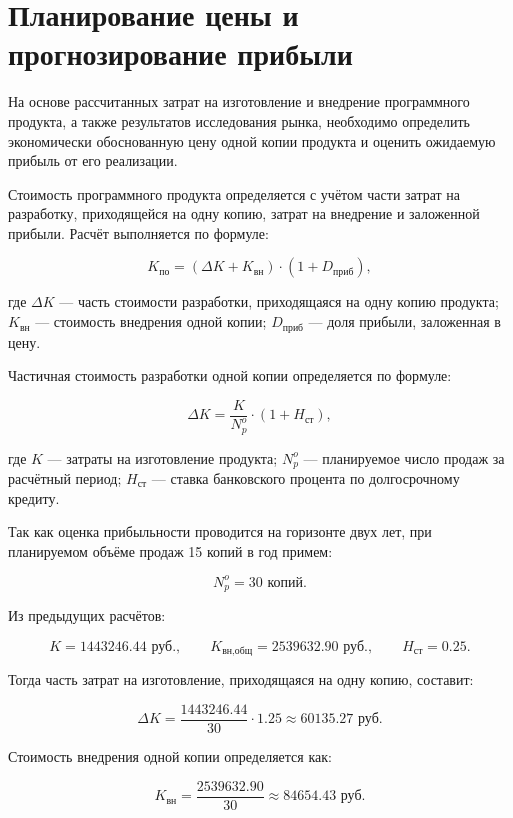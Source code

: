 \section{Планирование цены и прогнозирование прибыли}

На основе рассчитанных затрат на изготовление и внедрение программного
продукта, а также результатов исследования рынка, необходимо
определить экономически обоснованную цену одной копии продукта и
оценить ожидаемую прибыль от его реализации.

Стоимость программного продукта определяется с учётом части затрат на
разработку, приходящейся на одну копию, затрат на внедрение и
заложенной прибыли. Расчёт выполняется по формуле:

\begin{equation}
K_{\text{по}} = (\Delta K + K_{\text{вн}})\cdot(1 + D_{\text{приб}}),
\end{equation}

где $\Delta K$ --- часть стоимости разработки, приходящаяся на одну
копию продукта; $K_{\text{вн}}$ --- стоимость внедрения одной копии;
$D_{\text{приб}}$ --- доля прибыли, заложенная в цену.

Частичная стоимость разработки одной копии определяется по формуле:

\begin{equation}
\Delta K = \frac{K}{N_p^o}\cdot(1 + H_{\text{ст}}),
\end{equation}

где $K$ --- затраты на изготовление продукта;
$N_p^o$ --- планируемое число продаж за расчётный период;
$H_{\text{ст}}$ --- ставка банковского процента по долгосрочному
кредиту.

Так как оценка прибыльности проводится на горизонте двух лет, при
планируемом объёме продаж 15 копий в год примем:

\[
N_p^o = 30 \text{ копий}.
\]

Из предыдущих расчётов:

\[
K = 1443246.44 \text{ руб.}, \qquad
K_{\text{вн,общ}} = 2539632.90 \text{ руб.}, \qquad
H_{\text{ст}} = 0.25.
\]

Тогда часть затрат на изготовление, приходящаяся на одну копию,
составит:

\[
\Delta K =
\frac{1443246.44}{30}\cdot 1.25 \approx 60135.27 \text{ руб.}
\]

Стоимость внедрения одной копии определяется как:

\[
K_{\text{вн}} =
\frac{2539632.90}{30} \approx 84654.43 \text{ руб.}
\]

